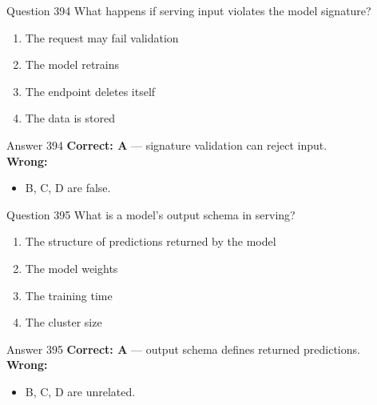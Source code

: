 \documentclass[aspectratio=169,11pt]{beamer}
\begin{document}
	\begin{frame}{Question 394}
		What happens if serving input violates the model signature?
		\begin{enumerate}[label=\Alph*.]
			\item The request may fail validation
			\item The model retrains
			\item The endpoint deletes itself
			\item The data is stored
		\end{enumerate}
	\end{frame}
	\begin{frame}{Answer 394}
		\textbf{Correct: A} --- signature validation can reject input.\\
		\vspace{0.5em}
		\textbf{Wrong:}
		\begin{itemize}
			\item B, C, D are false.
		\end{itemize}
	\end{frame}
	
	\begin{frame}{Question 395}
		What is a model's output schema in serving?
		\begin{enumerate}[label=\Alph*.]
			\item The structure of predictions returned by the model
			\item The model weights
			\item The training time
			\item The cluster size
		\end{enumerate}
	\end{frame}
	\begin{frame}{Answer 395}
		\textbf{Correct: A} --- output schema defines returned predictions.\\
		\vspace{0.5em}
		\textbf{Wrong:}
		\begin{itemize}
			\item B, C, D are unrelated.
		\end{itemize}
	\end{frame}
	
\end{document}
